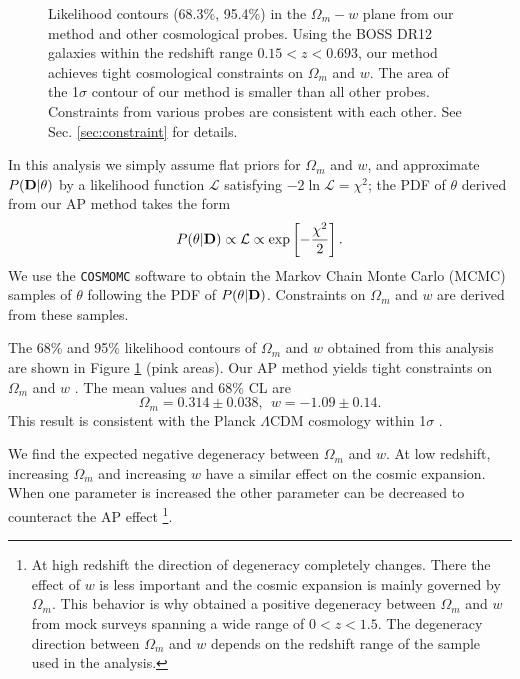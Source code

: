 \documentclass[iop]{emulateapj}
\begin{document}
\begin{figure}
   \caption{\label{fig_contours}
   Likelihood contours (68.3\%, 95.4\%) in the $\Omega_m-w$ plane from our method and other cosmological probes.
   Using the BOSS DR12 galaxies within the redshift range $0.15< z< 0.693$, our method achieves tight cosmological constraints on $\Omega_m$ and $w$.
   The area of the 1$\sigma$ contour of our method is smaller than all other probes.
   Constraints from various probes are consistent with each other.
   See Sec. \ref{sec:constraint} for details.
   }
\end{figure}

In this analysis we simply assume flat priors for $\Omega_m$ and $w$,
and approximate $P({\bf D}|{\bf \theta})$ by a likelihood function $\mathcal{L}$
satisfying  $-2 \ln \mathcal{L}=\chi^2$;
the PDF of $\theta$ derived from our AP method takes the form
\begin{equation}
 P({\bf \theta}|{\bf D}) \propto \mathcal{L} \propto \exp\left[-\frac{\chi^2}{2}\right].
\end{equation}
We use the {\texttt {COSMOMC}} software \citep{LB2002}
to obtain the Markov Chain Monte Carlo (MCMC) samples of $\theta$ following the PDF of $P({\bf \theta}|{\bf D})$.
Constraints on $\Omega_m$ and $w$ are derived from these samples.

The 68\% and 95\% likelihood contours of $\Omega_m$ and $w$ 
obtained from this analysis are shown in Figure \ref{fig_contours} (pink areas).
Our AP method yields tight constraints on $\Omega_m$ and $w$ .
The mean values and 68\% CL are
\begin{equation}
 \Omega_m=0.314 \pm 0.038,\ \ w = -1.09 \pm 0.14.
\end{equation}
This result is consistent with the Planck $\Lambda$CDM cosmology within 1$\sigma$ \citep{Planck2015}.

We find the expected negative degeneracy between $\Omega_m$ and $w$.
At low redshift, increasing $\Omega_m$ and increasing $w$ have a similar effect on the cosmic expansion.
When one parameter is increased the other parameter can be decreased to counteract the AP effect
\footnote{At high redshift the direction of degeneracy completely changes. 
There the effect of $w$ is less important and the cosmic expansion is mainly governed by $\Omega_m$.
This behavior is why \cite{Li2015} obtained a positive degeneracy between $\Omega_m$ and $w$ from mock surveys 
spanning a wide range of $0< z < 1.5$.
The degeneracy direction between $\Omega_m$ and $w$ depends on the redshift range of the sample used in the analysis.
}.
\end{document}
